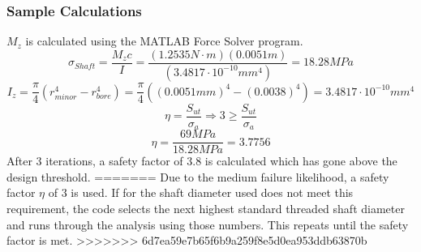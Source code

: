 \documentclass[../main.tex]{subfiles}
\begin{document}
\subsubsection*{Sample Calculations}
$M_z$ is calculated using the MATLAB Force Solver program.
$$\sigma _{Shaft}  = \dfrac{M_{z}c}{I} = \dfrac{(1.2535N\cdot{}m)(0.0051m)}{(3.4817\cdot{}10^{-10}mm^4)}=18.28MPa$$
$$I _{z}  = \dfrac{\pi}{4} (r_{minor}^4 - r_{bore}^4) = \dfrac{\pi}{4} ((0.0051mm)^4 - (0.0038)^4) = 3.4817\cdot{}10^{-10}mm^4$$
$$\eta = \dfrac{S_{ut}}{\sigma _a} \Rightarrow 3 \geq \dfrac{S_{ut}}{\sigma _a}$$
$$\eta = \dfrac{69MPa}{18.28MPa}=3.7756$$
After 3 iterations, a safety factor of 3.8 is calculated which has gone above the design threshold.
=======
Due to the medium failure likelihood, a safety factor $\eta$ of 3 is used. If for the shaft diameter used does not meet this requirement, the code selects the next highest standard threaded shaft diameter and runs through the analysis using those numbers. This repeats until the safety factor is met. 
>>>>>>> 6d7ea59e7b65f6b9a259f8e5d0ea953ddb63870b
\end{document}
